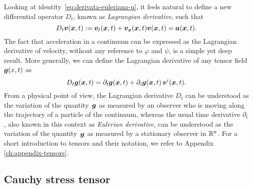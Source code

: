 Looking at identity~\eqref{eq:derivata-euleriana-u}, it feels natural
to define a new differential operator $D_t$, known as
\emph{Lagrangian derivative}, such that
\[
D_t \bm{v}(\bm{x},t) \vcentcolon= \bm{v}_t(\bm{x},t)
+ \bm{v}_{\bm{x}}(\bm{x},t) \bm{v}(\bm{x},t)
= \bm{a}(\bm{x},t).
\]
The fact that acceleration in a continuum can be expressed
as the Lagrangian derivative of velocity, without any
reference to $\varphi$ and $\psi$, is a simple yet deep result.
More generally, we can define the Lagrangian derivative of
any tensor field $\bm{g}(x,t)$ as
\begin{equation} \label{eq:derivata-lagrangiana}
D_t \bm{g}(\bm{x},t)
= \partial_t \bm{g}(\bm{x},t)
+ \partial_i \bm{g}(\bm{x},t) \, \bm{v}^i(\bm{x},t).
\end{equation}
From a physical point of view, the Lagrangian derivative $D_t$
can be understood as the variation of the quantity~$\bm{g}$ as
measured by an observer who is moving along the trajectory
of a particle of the continuum, whereas the usual time derivative $\partial_t$,
also known in this context as \emph{Eulerian derivative}, can be understood
as the variation of the quantity~$\bm{g}$ as measured by a stationary
observer in $\mathbb{R}^n$.
For a short introduction to tensors and their notation,
we refer to Appendix \ref{ch:appendix-tensors}.

\subsection*{Cauchy stress tensor}

